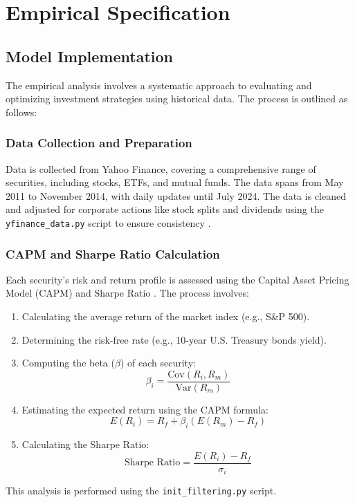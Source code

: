 \section{Empirical Specification}

\subsection{Model Implementation}
The empirical analysis involves a systematic approach to evaluating and optimizing investment strategies using historical data. The process is outlined as follows:

\subsubsection{Data Collection and Preparation}
Data is collected from Yahoo Finance, covering a comprehensive range of securities, including stocks, ETFs, and mutual funds. The data spans from May 2011 to November 2014, with daily updates until July 2024. The data is cleaned and adjusted for corporate actions like stock splits and dividends using the \texttt{yfinance\_data.py} script to ensure consistency \citep{yfinance}.

\subsubsection{CAPM and Sharpe Ratio Calculation}
Each security's risk and return profile is assessed using the Capital Asset Pricing Model (CAPM) and Sharpe Ratio \citep{sharpe1966mutual}. The process involves:
\begin{enumerate}
    \item Calculating the average return of the market index (e.g., S\&P 500).
    \item Determining the risk-free rate (e.g., 10-year U.S. Treasury bonds yield).
    \item Computing the beta (\(\beta\)) of each security:
    \begin{equation}
        \beta_i = \frac{\text{Cov}(R_i, R_m)}{\text{Var}(R_m)}
    \end{equation}
    \item Estimating the expected return using the CAPM formula:
    \begin{equation}
        E(R_i) = R_f + \beta_i (E(R_m) - R_f)
    \end{equation}
    \item Calculating the Sharpe Ratio:
    \begin{equation}
        \text{Sharpe Ratio} = \frac{E(R_i) - R_f}{\sigma_i}
    \end{equation}
\end{enumerate}
This analysis is performed using the \texttt{init\_filtering.py} script.

